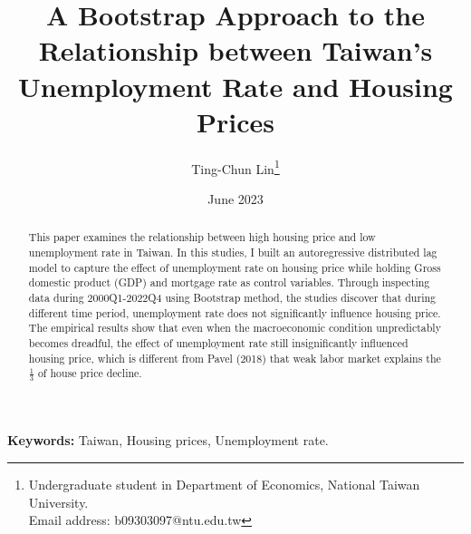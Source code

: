 \documentclass[12pt]{article}
\title{ A Bootstrap Approach to the Relationship between Taiwan's Unemployment Rate and Housing Prices }
\author{Ting-Chun Lin\thanks{
Undergraduate student in Department of Economics, National Taiwan University.\\ 
Email address: b09303097@ntu.edu.tw
}
}
\date{June 2023}
\begin{document}
\maketitle
\begin{abstract}{
    This paper examines the relationship between high housing price and low unemployment rate in Taiwan. In this studies, I built an autoregressive distributed lag model to capture the effect of unemployment rate on housing price while holding Gross domestic product (GDP) and mortgage rate as control variables. Through inspecting data during 2000Q1-2022Q4 using Bootstrap method, the studies discover that during different time period, unemployment rate does not significantly influence housing price. The empirical results show that even when the macroeconomic condition unpredictably becomes dreadful, the effect of unemployment rate still insignificantly influenced housing price, which is different from Pavel (2018) that weak labor market explains the $\frac{1}{3}$ of house price decline.
    
}
\end{abstract}
\textbf{Keywords:} Taiwan, Housing prices, Unemployment rate.
\newpage
\end{document}
